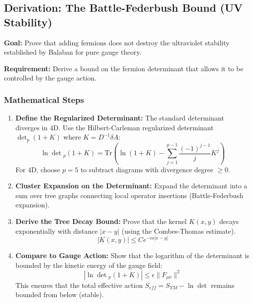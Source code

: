 \subsection{Derivation: The Battle-Federbush Bound (UV Stability)}

\textbf{Goal:} Prove that adding fermions does not destroy the ultraviolet stability established by Balaban for pure gauge theory.

\textbf{Requirement:} Derive a bound on the fermion determinant that allows it to be controlled by the gauge action.

\subsubsection*{Mathematical Steps}

\begin{enumerate}
    \item \textbf{Define the Regularized Determinant:}
    The standard determinant diverges in 4D. Use the Hilbert-Carleman regularized determinant $\det_p(1+K)$ where $K = D^{-1} \delta A$:
    \begin{equation}
        \ln \det{}_p (1+K) = \text{Tr} \left( \ln(1+K) - \sum_{j=1}^{p-1} \frac{(-1)^{j-1}}{j} K^j \right)
    \end{equation}
    For 4D, choose $p=5$ to subtract diagrams with divergence degree $\ge 0$.

    \item \textbf{Cluster Expansion on the Determinant:}
    Expand the determinant into a sum over tree graphs connecting local operator insertions (Battle-Federbush expansion).

    \item \textbf{Derive the Tree Decay Bound:}
    Prove that the kernel $K(x,y)$ decays exponentially with distance $|x-y|$ (using the Combes-Thomas estimate).
    \begin{equation}
        |K(x,y)| \le C e^{-m |x-y|}
    \end{equation}

    \item \textbf{Compare to Gauge Action:}
    Show that the logarithm of the determinant is bounded by the kinetic energy of the gauge field:
    \begin{equation}
        |\ln \det{}_p (1+K)| \le \epsilon \|F_{\mu\nu}\|^2
    \end{equation}
    This ensures that the total effective action $S_{eff} = S_{YM} - \ln \det$ remains bounded from below (stable).
\end{enumerate}

